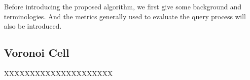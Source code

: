 Before introducing the proposed algorithm, we first give some background and terminologies. And the metrics generally used to evaluate the query process will also be introduced.

\subsection{Voronoi Cell}


XXXXXXXXXXXXXXXXXXXXX